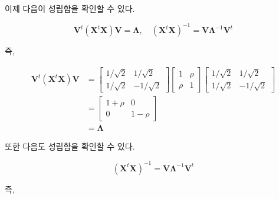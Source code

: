 \documentclass[
]{book}
\begin{document}
이제 다음이 성립함을 확인할 수 있다.

\[ \bm V^t (\bm X^t \bm X) \bm V =  \bm \Lambda, \quad (\bm X^t \bm X)^{-1} =  \bm V \bm \Lambda^{-1} \bm V^t   \]

즉,

\begin{align*}
\bm V^t (\bm X^t \bm X) \bm V 
& =  
\begin{bmatrix} 
1/\sqrt{2} &  1/\sqrt{2}\\
1/\sqrt{2} &  -1/\sqrt{2}
\end{bmatrix}
\begin{bmatrix} 
1 & \rho \\
\rho & 1
\end{bmatrix}
\begin{bmatrix} 
1/\sqrt{2} &  1/\sqrt{2}\\
1/\sqrt{2} &  -1/\sqrt{2}
\end{bmatrix} \\
& =
 \begin{bmatrix} 
1+\rho & 0 \\
0 & 1-\rho
\end{bmatrix} \\
&=
\bm \Lambda
\end{align*}

또한 다음도 성립함을 확인할 수 있다.

\[  (\bm X^t \bm X)^{-1} =  \bm V \bm \Lambda^{-1} \bm V^t   \]

즉,
\end{document}
